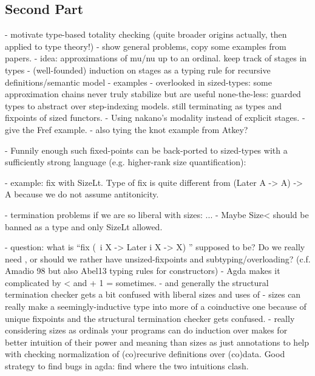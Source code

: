 \subsection{Second Part}
- motivate type-based totality checking (quite broader origins actually, then applied to type theory!)
  - show general problems, copy some examples from papers.
  - idea: approximations of mu/nu up to an ordinal. keep track of stages in types
  - (well-founded) induction on stages as a typing rule for recursive definitions/semantic model
    - examples 
  - overlooked in sized-types: some approximation chains never truly
  stabilize but are useful none-the-less: guarded types to abstract
  over step-indexing models. still terminating as types and fixpoints of sized functors.
  - Using nakano's modality instead of explicit stages.
    - give the Fref example.
    - also tying the knot example from Atkey?

  - Funnily enough such fixed-points can be back-ported to
    sized-types with a sufficiently strong language (e.g. higher-rank
    size quantification):
    
    - example: fix with SizeLt. Type of fix is quite different from
    (Later A -> A) -> A because we do not assume antitonicity.

    - termination problems if we are so liberal with sizes: ...
      - Maybe Size< should be banned as a type and only SizeLt allowed.

    - \inf question: what is ``fix (\ i X -> Later i X -> X) \inf''
    supposed to be? Do we really need \inf, or should we rather have
    unsized-fixpoints and subtyping/overloading? (c.f. Amadio 98 but
    also Abel13 typing rules for constructors)
     - Agda makes it complicated by \inf < \inf and \inf + 1 = \inf sometimes.
     - and generally the structural termination checker gets a bit confused with liberal sizes and uses of \inf
         - sizes can really make a seemingly-inductive type into more of a
         coinductive one because of unique fixpoints and the structural
         termination checker gets confused.
         - really considering sizes as ordinals your programs can do
         induction over makes for better intuition of their power and meaning than sizes as just
         annotations to help with checking normalization of (co)recurive definitions over (co)data.
         Good strategy to find bugs in agda: find where the two intuitions clash.



